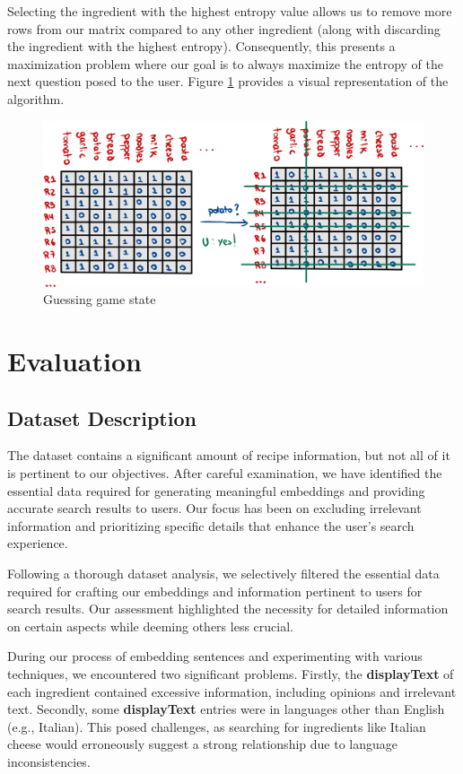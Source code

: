 \documentclass[runningheads]{llncs}
\begin{document}
Selecting the ingredient with the highest entropy value allows us to remove more rows from our matrix compared to any other ingredient (along with discarding the ingredient with the highest entropy). Consequently, this presents a maximization problem where our goal is to always maximize the entropy of the next question posed to the user. Figure \ref{akimat} provides a visual representation of the algorithm.

\begin{figure}[!htbp]
    \center
    \includegraphics[scale=0.15]{images/akinator}
    \caption{Guessing game state}
    \label{akimat}
\end{figure}

\section{Evaluation}
\subsection{Dataset Description}
The dataset contains a significant amount of recipe information, but not all of it is pertinent to our objectives. After careful examination, we have identified the essential data required for generating meaningful embeddings and providing accurate search results to users. Our focus has been on excluding irrelevant information and prioritizing specific details that enhance the user's search experience.

Following a thorough dataset analysis, we selectively filtered the essential data required for crafting our embeddings and information pertinent to users for search results. Our assessment highlighted the necessity for detailed information on certain aspects while deeming others less crucial.

During our process of embedding sentences and experimenting with various techniques, we encountered two significant problems. Firstly, the \textbf{displayText} of each ingredient contained excessive information, including opinions and irrelevant text. Secondly, some \textbf{displayText} entries were in languages other than English (e.g., Italian). This posed challenges, as searching for ingredients like Italian cheese would erroneously suggest a strong relationship due to language inconsistencies.
\end{document}
